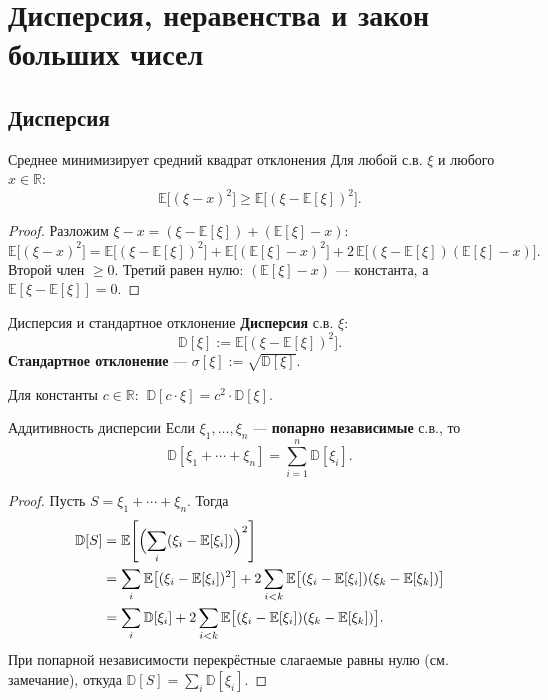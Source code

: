 
\section{Дисперсия, неравенства и закон больших чисел}

\subsection{Дисперсия}

\begin{Statement}{Среднее минимизирует средний квадрат отклонения}{}
	Для любой с.в. $\xi$ и любого $x\in\mathbb{R}$:
	\[
	\mathbb{E}\bigl[(\xi-x)^2\bigr]\ge\mathbb{E}\bigl[(\xi-\mathbb{E}[\xi])^2\bigr].
	\]
\end{Statement}

\begin{proof}
	Разложим $\xi-x=(\xi-\mathbb{E}[\xi])+(\mathbb{E}[\xi]-x)$:
	\[
	\mathbb{E}\bigl[(\xi-x)^2\bigr]
	=\mathbb{E}\bigl[(\xi-\mathbb{E}[\xi])^2\bigr]
	+\mathbb{E}\bigl[(\mathbb{E}[\xi]-x)^2\bigr]
	+2\,\mathbb{E}\bigl[(\xi-\mathbb{E}[\xi])(\mathbb{E}[\xi]-x)\bigr].
	\]
	Второй член $\ge 0$. Третий равен нулю: $(\mathbb{E}[\xi]-x)$ — константа, а $\mathbb{E}[\xi-\mathbb{E}[\xi]]=0$.
\end{proof}

\begin{Definition}{Дисперсия и стандартное отклонение}{}
	\textbf{Дисперсия} с.в. $\xi$:
	\[
	\mathbb{D}[\xi]:=\mathbb{E}\bigl[(\xi-\mathbb{E}[\xi])^2\bigr].
	\]
	\textbf{Стандартное отклонение} — $\sigma[\xi]:=\sqrt{\mathbb{D}[\xi]}$.
\end{Definition}

\begin{Statement}{}{}
	Для константы $c\in\mathbb{R}$: $\ \mathbb{D}[c\cdot\xi]=c^2\cdot\mathbb{D}[\xi]$.
\end{Statement}

\begin{Theorem}{Аддитивность дисперсии}{}
	Если $\xi_1,\dots,\xi_n$ — \textbf{попарно независимые} с.в., то
	\[
	\mathbb{D}[\xi_1+\cdots+\xi_n]=\sum_{i=1}^n\mathbb{D}[\xi_i].
	\]
\end{Theorem}

\begin{proof}
	Пусть $S=\xi_1+\cdots+\xi_n$. Тогда
	\begin{align*}
		\mathbb{D}[S]
		&=\mathbb{E}\!\left[\Bigl(\sum_i(\xi_i-\mathbb{E}[\xi_i])\Bigr)^2\right]\\
		&=\sum_i\mathbb{E}\bigl[(\xi_i-\mathbb{E}[\xi_i])^2\bigr]
		+2\sum_{i<k}\mathbb{E}\bigl[(\xi_i-\mathbb{E}[\xi_i])(\xi_k-\mathbb{E}[\xi_k])\bigr]\\
		&=\sum_i\mathbb{D}[\xi_i]+2\sum_{i<k}\mathbb{E}\bigl[(\xi_i-\mathbb{E}[\xi_i])(\xi_k-\mathbb{E}[\xi_k])\bigr].
	\end{align*}
	При попарной независимости перекрёстные слагаемые равны нулю (см. замечание), откуда $\mathbb{D}[S]=\sum_i\mathbb{D}[\xi_i]$.
\end{proof}

